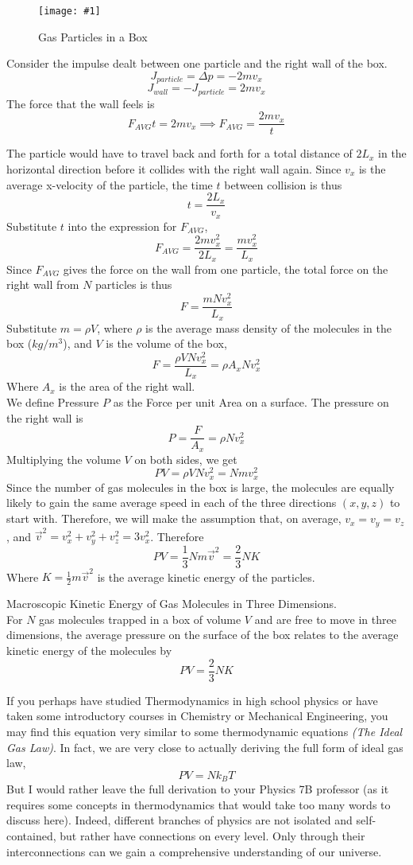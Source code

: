 \documentclass[11pt]{article}
\newcommand{\fig}[4]{
    \begin{figure}[H]
        \centering
        \texttt{[image: \#1]}
        \caption{#2}
        \label{exp4fit}
    \end{figure}
}
\theoremstyle{gangnamstyle}{\newtheorem{definition}{Definition}[]}
\theoremstyle{gangnamstyle}{\newtheorem{example}{Example}[]}
\theoremstyle{gangnamstyle}{\newtheorem{problem}{Problem}[]}
\theoremstyle{gangnamstyle}{\newtheorem{warning}{Warning}[]}
\begin{document}
\fig{figs/n4/box.png}{Gas Particles in a Box}{0.45}{0}

Consider the impulse dealt between one particle and the right wall of the box. 
\[ J_{particle} = \Delta p = -2mv_x \]
\[ J_{wall} = -J_{particle} = 2mv_x \]
The force that the wall feels is
\[ F_{AVG}t = 2mv_x \implies F_{AVG} = \frac{2mv_x}{t} \]

The particle would have to travel back and forth for a total distance of $2L_x$ in the horizontal direction before it collides with the right wall again. Since $v_x$ is the average x-velocity of the particle, the time $t$ between collision is thus
\[ t = \frac{2L_x}{v_x} \]
Substitute $t$ into the expression for $F_{AVG}$, 
\[ F_{AVG} = \frac{2mv_x^2}{2L_x} = \frac{mv_x^2}{L_x} \]
Since $F_{AVG}$ gives the force on the wall from one particle, the total force on the right wall from $N$ particles is thus
\[ F = \frac{mNv_x^2}{L_x} \]
Substitute $m = \rho V$, where $\rho$ is the average mass density of the molecules in the box ($kg/m^3$), and $V$ is the volume of the box, 
\[ F = \frac{\rho VNv_x^2}{L_x} = \rho A_xNv_x^2 \]
Where $A_x$ is the area of the right wall. \\
We define Pressure $P$ as the Force per unit Area on a surface. The pressure on the right wall is
\[ P = \frac{F}{A_x} = \rho Nv_x^2 \]
Multiplying the volume $V$ on both sides, we get
\[ PV = \rho VNv_x^2 = Nmv_x^2 \]
Since the number of gas molecules in the box is large, the molecules are equally likely to gain the same average speed in each of the three directions $(x, y, z)$ to start with. Therefore, we will make the assumption that, on average, $v_x = v_y = v_z$, and $\Vec{v}^2 = v_x^2 + v_y^2 + v_z^2 = 3v_x^2$. Therefore
\[ PV = \frac{1}{3}Nm\Vec{v}^2 = \frac{2}{3}NK \]
Where $K = \frac{1}{2}m\Vec{v}^2$ is the average kinetic energy of the particles. 

\begin{definition}
Macroscopic Kinetic Energy of Gas Molecules in Three Dimensions. \\
For $N$ gas molecules trapped in a box of volume $V$ and are free to move in three dimensions, the average pressure on the surface of the box relates to the average kinetic energy of the molecules by
\begin{equation}
PV = \frac{2}{3}NK
\end{equation}
\end{definition}

If you perhaps have studied Thermodynamics in high school physics or have taken some introductory courses in Chemistry or Mechanical Engineering, you may find this equation very similar to some thermodynamic equations \textit{(The Ideal Gas Law)}. In fact, we are very close to actually deriving the full form of ideal gas law, 
\[ PV = Nk_BT \]
But I would rather leave the full derivation to your Physics 7B professor (as it requires some concepts in thermodynamics that would take too many words to discuss here). Indeed, different branches of physics are not isolated and self-contained, but rather have connections on every level. Only through their interconnections can we gain a comprehensive understanding of our universe. 
\end{document}
